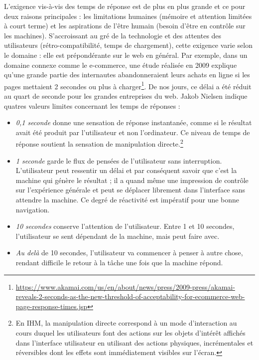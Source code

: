 L'exigence vis-à-vis des temps de réponse est de plus en plus 
grande et ce pour deux raisons principales : les limitations humaines (mémoire et 
attention limitées 
à court terme) et les aspirations de l'être humain (besoin d'être en contrôle sur les 
machines). S'accroissant au gré de la technologie et des attentes des 
utilisateurs (rétro-compatibilité, temps de 
chargement), cette exigence varie selon le domaine : elle est prépondérante sur le 
web en général. 
Par exemple, dans un domaine connexe comme le e-commerce, une étude réalisée 
en 2009 explique qu’une grande partie des internautes abandonneraient leurs achats 
en ligne si les pages mettaient 2 secondes ou plus à charger\footnote{\url{https://www.akamai.com/us/en/about/news/press/2009-press/akamai-reveals-2-seconds-as-the-new-threshold-of-acceptability-for-ecommerce-web-page-response-times.jsp}}. De nos jours, ce 
délai a été réduit au quart de seconde pour les grandes entreprises du web. Jakob 
Nielsen \cite{Nielsen1993a} indique quatres valeurs limites concernant les 
temps de réponses :
\begin{itemize}
	\item \textit{0,1 seconde} donne une sensation de réponse instantanée, comme 
	si le 
	résultat avait été produit par l'utilisateur et non l'ordinateur. Ce niveau de temps 
	de réponse soutient la sensation de manipulation directe.\footnote{En IHM, la 
		manipulation directe correspond à un mode d'interaction au cours duquel les 
		utilisateurs font des actions sur les objets d'intérêt affichés dans l'interface 
		utilisateur en utilisant des actions physiques, incrémentales et réversibles 
		dont 
		les effets sont immédiatement visibles sur l'écran.} 
	\item \textit{1 seconde} garde le flux de pensées de l'utilisateur sans 
	interruption. 
	L'utilisateur peut ressentir un délai et par conséquent savoir que c'est la 
	machine qui génère le résultat ; il a quand même une impression de 
	contrôle sur l'expérience générale et peut se déplacer librement dans l'interface 
	sans attendre la machine. Ce degré de réactivité est impératif pour une bonne 
	navigation.
	\item \textit{10 secondes} conserve l'attention de l'utilisateur. Entre 1 et 10 
	secondes, l'utilisateur se sent dépendant de la machine, mais peut faire avec. 
	\item \textit{Au delà} de 10 secondes, l'utilisateur va commencer à penser à autre chose, rendant difficile 
	le retour à la tâche une fois que la machine répond.
\end{itemize} 
